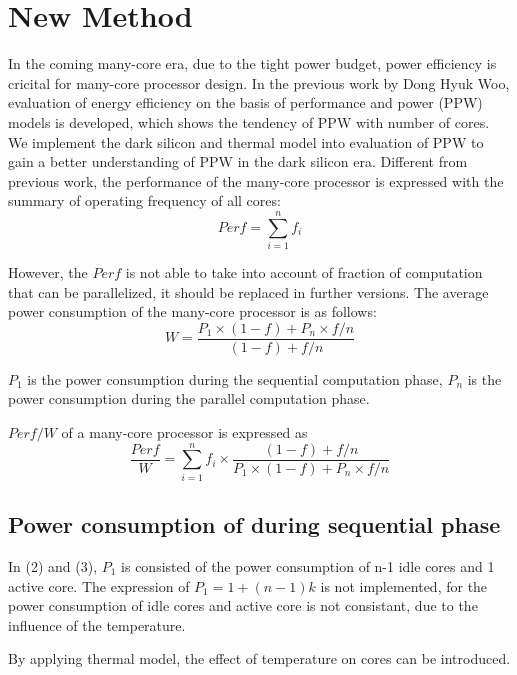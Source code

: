 \section{New Method}
In the coming many-core era, due to the tight power budget, power efficiency is cricital for
many-core processor design. In the previous work by Dong Hyuk Woo, evaluation of energy
efficiency on the basis of performance and power (PPW) models is developed, which shows the
tendency of PPW with number of cores. We implement the dark silicon and thermal model into
evaluation of PPW to gain a better understanding of PPW in the dark silicon era.
Different from previous work, the performance of the many-core processor is expressed with
the summary of operating frequency of all cores:
\begin{equation}\label{perf}
Perf = \sum_{i=1}^n f_{i}
\end{equation}

However, the $Perf$ is not able to take into account of fraction of computation that can be
parallelized, it should be replaced in further versions.
The average power consumption of the many-core processor is as follows:
\begin{equation}\label{average_power}
W = \frac{P_{1} \times (1-f)+P_{n} \times f/n}{(1-f)+f/n}
\end{equation}

$P_{1}$ is the power consumption during the sequential computation phase, $P_{n}$ is the power consumption during the parallel computation phase. 

$Perf/W$ of a many-core processor is expressed as
\begin{equation}\label{perf/w}
\frac{Perf}{W} = \sum_{i=1}^n f_{i} \times \frac{(1-f)+f/n}{P_{1} \times (1-f)+P_{n} \times f/n}
\end{equation}

\subsection{Power consumption of during sequential phase}

In (2) and (3), $P_{1}$ is consisted of the power consumption of n-1 idle cores and 1 active 
core. The expression of $P_{1} = 1+(n-1)k$ is not implemented, for the power consumption of 
idle cores and active core is not consistant, due to the influence of the temperature.

By applying thermal model, the effect of temperature on cores can be introduced. 